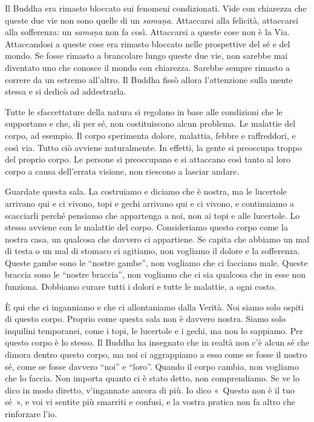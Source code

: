 Il Buddha era rimasto bloccato sui fenomeni condizionati. Vide con
chiarezza che queste due vie non sono quelle di un \emph{samaṇa}.
Attaccarsi alla felicità, attaccarsi alla sofferenza: un \emph{samaṇa}
non fa così. Attaccarsi a queste cose non è la Via. Attaccandosi a
queste cose era rimasto bloccato nelle prospettive del sé e del mondo.
Se fosse rimasto a brancolare lungo queste due vie, non sarebbe mai
diventato uno che conosce il mondo con chiarezza. Sarebbe sempre rimasto
a correre da un estremo all'altro. Il Buddha fissò allora l'attenzione
sulla mente stessa e si dedicò ad addestrarla.

Tutte le sfaccettature della natura si regolano in base alle condizioni
che le supportano e che, di per sé, non costituiscono alcun problema. Le
malattie del corpo, ad esempio. Il corpo sperimenta dolore, malattia,
febbre e raffreddori, e così via. Tutto ciò avviene naturalmente. In
effetti, la gente si preoccupa troppo del proprio corpo. Le persone si
preoccupano e si attaccano così tanto al loro corpo a causa dell'errata
visione, non riescono a lasciar andare.

Guardate questa sala. La costruiamo e diciamo che è nostra, ma le
lucertole arrivano qui e ci vivono, topi e gechi arrivano qui e ci
vivono, e continuiamo a scacciarli perché pensiamo che appartenga a noi,
non ai topi e alle lucertole. Lo stesso avviene con le malattie del
corpo. Consideriamo questo corpo come la nostra casa, un qualcosa che
davvero ci appartiene. Se capita che abbiamo un mal di testa o un mal di
stomaco ci agitiamo, non vogliamo il dolore e la sofferenza. Queste
gambe sono le ``nostre gambe'', non vogliamo che ci facciano male.
Queste braccia sono le ``nostre braccia'', non vogliamo che ci sia
qualcosa che in esse non funziona. Dobbiamo curare tutti i dolori e
tutte le malattie, a ogni costo.

È qui che ci inganniamo e che ci allontaniamo dalla Verità. Noi siamo
solo ospiti di questo corpo. Proprio come questa sala non è davvero
nostra. Siamo solo inquilini temporanei, come i topi, le lucertole e i
gechi, ma non lo sappiamo. Per questo corpo è lo stesso. Il Buddha ha
insegnato che in realtà non c'è alcun sé che dimora dentro questo corpo,
ma noi ci aggrappiamo a esso come se fosse il nostro sé, come se fosse
davvero ``noi'' e ``loro''. Quando il corpo cambia, non vogliamo che lo
faccia. Non importa quanto ci è stato detto, non comprendiamo. Se ve lo
dico in modo diretto, v'ingannate ancora di più. Io dico «~Questo non è
il tuo sé~», e voi vi sentite più smarriti e confusi, e la vostra
pratica non fa altro che rinforzare l'io.

